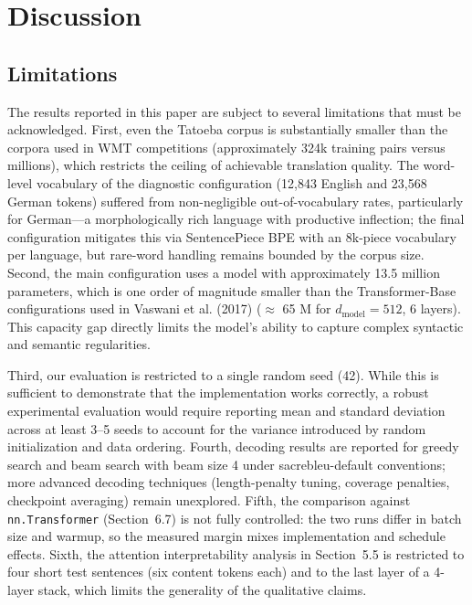 \section{Discussion}

\subsection{Limitations}

The results reported in this paper are subject to several limitations that must be acknowledged. First, even the Tatoeba corpus is substantially smaller than the corpora used in WMT competitions (approximately 324k training pairs versus millions), which restricts the ceiling of achievable translation quality. The word-level vocabulary of the diagnostic configuration (12,843 English and 23,568 German tokens) suffered from non-negligible out-of-vocabulary rates, particularly for German---a morphologically rich language with productive inflection; the final configuration mitigates this via SentencePiece BPE with an 8k-piece vocabulary per language, but rare-word handling remains bounded by the corpus size. Second, the main configuration uses a model with approximately 13.5 million parameters, which is one order of magnitude smaller than the Transformer-Base configurations used in Vaswani et al. (2017) ($\approx$ 65 M for $d_{\text{model}}=512$, 6 layers). This capacity gap directly limits the model's ability to capture complex syntactic and semantic regularities.

Third, our evaluation is restricted to a single random seed (42). While this is sufficient to demonstrate that the implementation works correctly, a robust experimental evaluation would require reporting mean and standard deviation across at least 3--5 seeds to account for the variance introduced by random initialization and data ordering. Fourth, decoding results are reported for greedy search and beam search with beam size 4 under sacrebleu-default conventions; more advanced decoding techniques (length-penalty tuning, coverage penalties, checkpoint averaging) remain unexplored. Fifth, the comparison against \texttt{nn.Transformer} (Section~6.7) is not fully controlled: the two runs differ in batch size and warmup, so the measured margin mixes implementation and schedule effects. Sixth, the attention interpretability analysis in Section~5.5 is restricted to four short test sentences (six content tokens each) and to the last layer of a 4-layer stack, which limits the generality of the qualitative claims.

